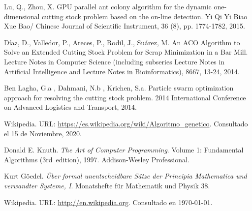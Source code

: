 \documentclass[a4paper,10pt,twocolumn]{article}
\begin{document}
\begin{thebibliography}{99}
	Lu, Q., Zhou, X. GPU parallel ant colony algorithm
	for the dynamic one-dimensional cutting stock problem
	based on the on-line detection. Yi Qi Yi Biao Xue Bao/
	Chinese Journal of Scientific Instrument, 36 (8), pp.
	1774-1782, 2015.
	
	  Díaz, D., Valledor, P., Areces, P., Rodil, J., Suárez, M.
	An ACO Algorithm to Solve an Extended Cutting Stock
	Problem for Scrap Minimization in a Bar Mill. Lecture
	Notes in Computer Science (including subseries Lecture
	Notes in Artificial Intelligence and Lecture Notes in
	Bioinformatics), 8667, 13-24, 2014.
	
	 Ben Lagha, G.a , Dahmani, N.b , Krichen, S.a.
	Particle swarm optimization approach for resolving the
	cutting stock problem. 2014 International Conference
	on Advanced Logistics and Transport, 2014.
	
	 Wikipedia. URL: \href{https://es.wikipedia.org/wiki/Algoritmo\_genetico}
	{https://es.wikipedia.org/wiki/Algoritmo\_genetico}.
	Consultado el 15 de Noviembre, 2020.
	
	 Donald E. Knuth. \emph{The Art of Computer Programming}.
		Volume 1: Fundamental Algorithms (3rd~edition), 1997.
		Addison-Wesley Professional.

	 Kurt Göedel. \emph{Über formal unentscheidbare Sätze der
		Principia Mathematica und verwandter Systeme, I}.
		Monatshefte für Mathematik und Physik 38.

	 Wikipedia. URL: \href{http://en.wikipedia.org}
	  {http://en.wikipedia.org}.
		Consultado en \today.

\end{thebibliography}


\label{end}
\end{document}

